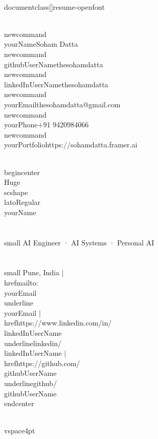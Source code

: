 \\documentclass[]{resume-openfont}
\begin{document}
\\newcommand{\\yourName}{Soham Datta}
\\newcommand{\\githubUserName}{thesohamdatta}
\\newcommand{\\linkedInUserName}{thesohamdatta}
\\newcommand{\\yourEmail}{thesohamdatta@gmail.com}
\\newcommand{\\yourPhone}{+91 9420984066}
\\newcommand{\\yourPortfolio}{https://sohamdatta.framer.ai}

\\begin{center}
    \\Huge \\scshape \\latoRegular{\\yourName} \\\\[-1pt]
    \\small AI Engineer · AI Systems · Personal AI \\\\[-1pt]
    \\small Pune, India $|$
    \\href{mailto:\\yourEmail}{\\underline{\\yourEmail}} $|$
    \\href{https://www.linkedin.com/in/\\linkedInUserName}{\\underline{linkedin/\\linkedInUserName}} $|$
    \\href{https://github.com/\\githubUserName}{\\underline{github/\\githubUserName}}
\\end{center}

\\vspace{4pt}
\end{document}
